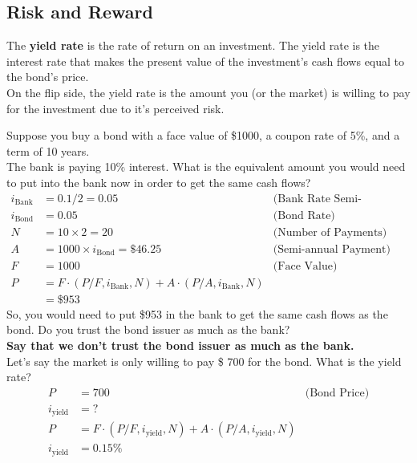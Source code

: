 \subsection{Risk and Reward}
\begin{definition}
    The \textbf{yield rate} is the rate of return on an investment. The yield rate is the interest rate that makes the present value of the investment's cash flows equal to the bond's price. \\
    On the flip side, the yield rate is the amount you (or the market) is willing to pay for the investment due to it's perceived risk.
\end{definition}
\begin{example}
    Suppose you buy a bond with a face value of \$1000, a coupon rate of 5\%, and a term of 10 years.\\
    The bank is paying 10\% interest. What is the equivalent amount you would need to put into the bank now in order to get the same cash flows?
    \begin{align*}
        i_{\text{Bank}} &= 0.1/2 = 0.05 \quad &\text{(Bank Rate Semi-annually)}\\
        i_{\text{Bond}} &= 0.05 \quad &\text{(Bond Rate)}\\
        N &= 10\times 2 = 20 \quad &\text{(Number of Payments)}\\
        A &= 1000\times i_{\text{Bond}} =\$ 46.25 &\text{(Semi-annual Payment)}\\
        F &= 1000 &\text{(Face Value)}\\
        P &= F\cdot (P/F, i_{\text{Bank}}, N) + A\cdot (P/A, i_{\text{Bank}}, N)\\
        & = \$ 953
    \end{align*}
    So, you would need to put \$953 in the bank to get the same cash flows as the bond. Do you trust the bond issuer as much as the bank? \\
    \textbf{Say that we don't trust the bond issuer as much as the bank.} \\
    Let's say the market is only willing to pay \$ 700 for the bond. What is the yield rate?
    \begin{align*}
        P &= 700 \quad &\text{(Bond Price)}\\
        i_{\text{yield}} &= ?\\
        P &= F\cdot (P/F, i_{\text{yield}}, N) + A\cdot (P/A, i_{\text{yield}}, N)\\
        i_{\text{yield}} &= 0.15\%
    \end{align*}
\end{example}

